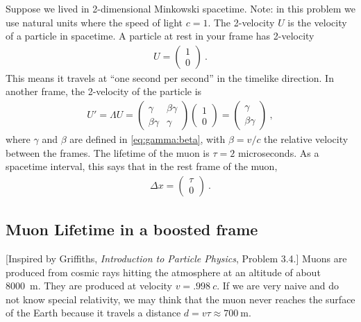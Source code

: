 \documentclass[12pt]{article}
\numberwithin{equation}{section}    %
\begin{document}
Suppose we lived in 2-dimensional Minkowski spacetime. Note: in this problem we use natural units where the speed of light $c=1$.
%
The 2-velocity $U$ is the velocity of a particle in spacetime. A particle at rest in your frame has 2-velocity
\begin{align}
	U = 
	\begin{pmatrix}
		1 \\ 0
	\end{pmatrix} \ .
\end{align}
This means it travels at 	``one second per second'' in the timelike direction. In another frame, the 2-velocity of the particle is
\begin{align}
	U' = \Lambda U = 
	\begin{pmatrix}
		\gamma & \beta \gamma\\
		\beta \gamma & \gamma
	\end{pmatrix}
	\begin{pmatrix}
		1 \\ 0
	\end{pmatrix}
	= 
	\begin{pmatrix}
		\gamma \\ \beta\gamma
	\end{pmatrix} \ ,
\end{align}
where $\gamma$ and $\beta$ are defined in \eqref{eq:gamma:beta}, with $\beta = v/c$ the relative velocity between the frames. The lifetime of the muon is $\tau =2$ microseconds. As a spacetime interval, this says that in the rest frame of the muon, 
\begin{align}
	\Delta x = 
	\begin{pmatrix}
		\tau \\ 0
	\end{pmatrix} \ .
\end{align}


\subsection{Muon Lifetime in a boosted frame}

[Inspired by Griffiths, \emph{Introduction to Particle Physics}, Problem 3.4.] Muons are produced from cosmic rays hitting the atmosphere at an altitude of about 8000~m. They are produced at velocity $v=.998~c$. If we are very naive and do not know special relativity, we may think that the muon never reaches the surface of the Earth because it travels a distance $d = v \tau \approx 700~\text{m}$.
\end{document}
